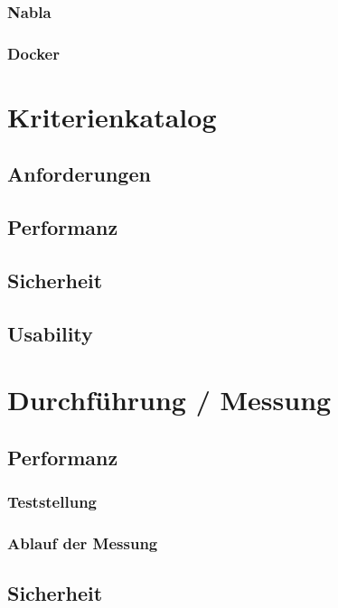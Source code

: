 \subsection{Nabla}

\subsection{Docker}

\chapter{Kriterienkatalog}

\section{Anforderungen}

\section{Performanz}

\section{Sicherheit}

\section{Usability}

\chapter{Durchführung / Messung}

\section{Performanz}

\subsection{Teststellung}

\subsection{Ablauf der Messung}

\section{Sicherheit}

